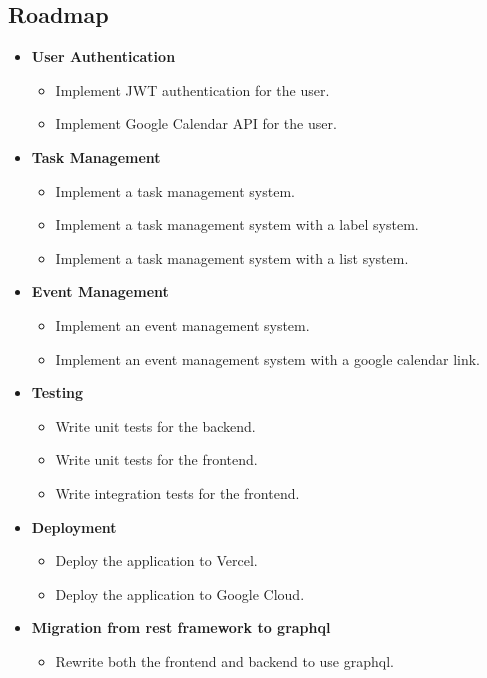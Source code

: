 \documentclass[10pt, a4paper]{article}
\begin{document}
      \subsection{Roadmap}
        \begin{itemize}
          \item
            \textbf{User Authentication}
            \begin{itemize}
              \item
                Implement JWT authentication for the user.
              \item
                Implement Google Calendar API for the user.
            \end{itemize}
          \item
            \textbf{Task Management}
            \begin{itemize}
              \item
                Implement a task management system.
              \item
                Implement a task management system with a label system.
              \item
                Implement a task management system with a list system.
            \end{itemize}
          \item
            \textbf{Event Management}
            \begin{itemize}
              \item
                Implement an event management system.
              \item
                Implement an event management system with a google calendar link.
            \end{itemize}
          \item 
            \textbf{Testing}
            \begin{itemize}
              \item
                Write unit tests for the backend.
              \item 
                Write unit tests for the frontend.
              \item 
                Write integration tests for the frontend.
            \end{itemize}
          \item 
            \textbf{Deployment}
            \begin{itemize}
              \item
                Deploy the application to Vercel.
              \item
                Deploy the application to Google Cloud.
            \end{itemize}
          \item 
            \textbf{Migration from rest framework to graphql}
            \begin{itemize}
              \item
                Rewrite both the frontend and backend to use graphql.
            \end{itemize}
        \end{itemize}
\end{document}
